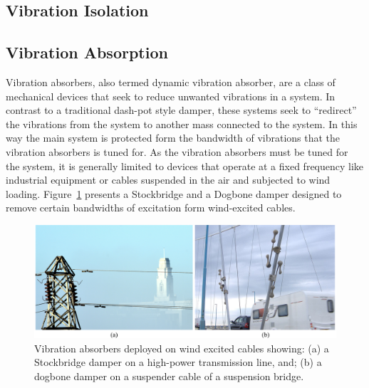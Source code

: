 \documentclass[12pt,letter]{article}
\numberwithin{ex}{section} %
\numberwithin{re}{section} %
\begin{document}
\subsection{Vibration Isolation}



\subsection{Vibration Absorption}

Vibration absorbers, also termed dynamic vibration absorber, are a class of mechanical devices that seek to reduce unwanted vibrations in a system. In contrast to a traditional dash-pot style damper, these systems seek to ``redirect'' the vibrations from the system to another mass connected to the system. In this way the main system is protected form the bandwidth of vibrations that the vibration absorbers is tuned for. As the vibration absorbers must be tuned for the system, it is generally limited to devices that operate at a fixed frequency like industrial equipment or cables suspended in the air and subjected to wind loading. Figure~\ref{fig:vibration_absorbers} presents a Stockbridge and a Dogbone damper designed to remove certain bandwidths of excitation form wind-excited cables.

\begin{figure}[H]
    \centering
    \includegraphics[width=6.5in]{../Figures/vibration_absorbers.png}
    \caption{Vibration absorbers deployed on wind excited cables showing: (a) a Stockbridge damper on a high-power transmission line\protect\footnotemark[1], and; (b) a dogbone damper on a suspender cable of a suspension bridge\protect\footnotemark[2].}
    \label{fig:vibration_absorbers}
\end{figure}
\end{document}
